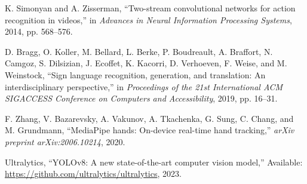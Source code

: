 \documentclass[11pt, a4paper]{article}
\begin{document}
\begin{thebibliography}{99}
K. Simonyan and A. Zisserman,
``Two-stream convolutional networks for action recognition in videos,''
in \textit{Advances in Neural Information Processing Systems}, 2014, pp. 568--576.

D. Bragg, O. Koller, M. Bellard, L. Berke, P. Boudreault, A. Braffort, N. Camgoz, S. Dilsizian, J. Ecoffet, K. Kacorri, D. Verhoeven, F. Weise, and M. Weinstock,
``Sign language recognition, generation, and translation: An interdisciplinary perspective,''
in \textit{Proceedings of the 21st International ACM SIGACCESS Conference on Computers and Accessibility}, 2019, pp. 16--31.

F. Zhang, V. Bazarevsky, A. Vakunov, A. Tkachenka, G. Sung, C. Chang, and M. Grundmann,
``MediaPipe hands: On-device real-time hand tracking,''
\textit{arXiv preprint arXiv:2006.10214}, 2020.

Ultralytics,
``YOLOv8: A new state-of-the-art computer vision model,''
Available: \url{https://github.com/ultralytics/ultralytics}, 2023.

\end{thebibliography}
\end{document}
